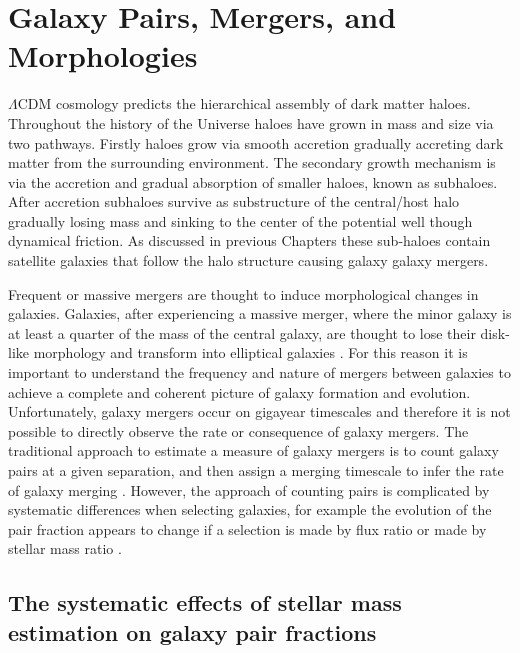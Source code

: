 
\chapter{Galaxy Pairs, Mergers, and Morphologies} 
\label{Chapter:GalPairs}

$\Lambda$CDM cosmology predicts the hierarchical assembly of dark matter haloes.
Throughout the history of the Universe haloes have grown in mass and size via two pathways. 
Firstly haloes grow via smooth accretion gradually accreting dark matter from the surrounding environment. 
The secondary growth mechanism is via the accretion and gradual absorption of smaller haloes, known as subhaloes. 
After accretion subhaloes survive as substructure of the central/host halo gradually losing mass and sinking to the center of the potential well though dynamical friction. As discussed in previous Chapters these sub-haloes contain satellite galaxies that follow the halo structure causing galaxy galaxy mergers.

Frequent or massive mergers are thought to induce morphological changes in galaxies. 
Galaxies, after experiencing a massive merger, where the minor galaxy is at least a quarter of the mass of the central galaxy, are thought to lose their disk-like morphology and transform into elliptical galaxies \citep{Negroponte1983SimulationsGalaxies, DeLucia2006TheGalaxies}. 
For this reason it is important to understand the frequency and nature of mergers between galaxies to achieve a complete and coherent picture of galaxy formation and evolution. 
Unfortunately, galaxy mergers occur on gigayear timescales and therefore it is not possible to directly observe the rate or consequence of galaxy mergers. 
The traditional approach to estimate a measure of galaxy mergers is to count galaxy pairs at a given separation, and then assign a merging timescale to infer the rate of galaxy merging \citep{Conselice2003A3,Conselice2008TheField,Mundy2017A3.5,Duncan2019ObservationalFields}.
However, the approach of counting pairs is complicated by systematic differences when selecting galaxies, for example the evolution of the pair fraction appears to change if a selection is made by flux ratio or made by stellar mass ratio \citep{Man2016RESOLVING03}.

\section{The systematic effects of stellar mass estimation on galaxy pair fractions}

